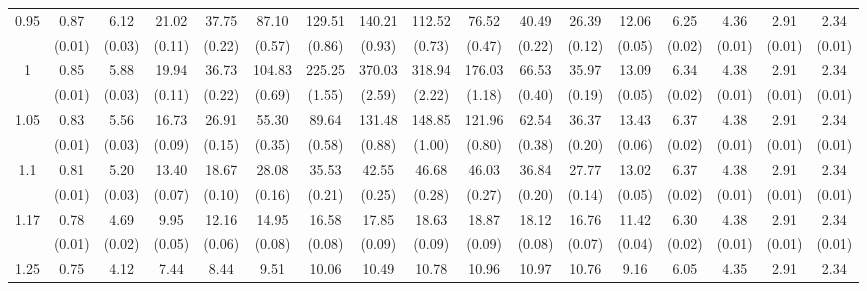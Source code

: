 \documentclass[12pt]{article}  %
\theoremstyle{plain}
\begin{document}
\begin{sidewaystable}[htbp]
\begin{tabular}{ccccccccccccccccc}
\multirow{2}{*}{0.95}  &0.87& 6.12& 21.02 &37.75 & 87.10& 129.51& 140.21& 112.52 & 76.52 &40.49& 26.39& 12.06& 6.25 &4.36& 2.91& 2.34 \\                
					  & (0.01)&   (0.03)&  (0.11)&  (0.22)&  (0.57)&  (0.86)&  (0.93)&  (0.73)&  (0.47)&  (0.22)&  (0.12)&  (0.05)& (0.02)& (0.01)& (0.01)& (0.01)\\ \hline
\multirow{2}{*}{1}  &  0.85 &5.88 &19.94& 36.73 &104.83& 225.25& 370.03 &318.94& 176.03& 66.53& 35.97& 13.09 &6.34 &4.38& 2.91& 2.34\\
                      & (0.01)&   (0.03)&  (0.11)&  (0.22)&  (0.69)&  (1.55)&  (2.59)&  (2.22)&  (1.18)&  (0.40)&  (0.19)&  (0.05)& (0.02)& (0.01)& (0.01)& (0.01)\\ \hline                                                                     
\multirow{2}{*}{1.05}  & 0.83 &5.56& 16.73& 26.91 & 55.30 & 89.64& 131.48& 148.85 &121.96 &62.54 &36.37& 13.43 &6.37 &4.38& 2.91 &2.34\\
                      & (0.01)&   (0.03)&  (0.09)&  (0.15)&  (0.35)&  (0.58)&  (0.88)&  (1.00)&  (0.80)&  (0.38)&  (0.20)&  (0.06)& (0.02)& (0.01)& (0.01)& (0.01)\\ \hline                                                                                                                                          
\multirow{2}{*}{1.1}  &0.81& 5.20& 13.40& 18.67&  28.08 & 35.53 & 42.55 & 46.68 & 46.03& 36.84& 27.77& 13.02& 6.37 &4.38& 2.91& 2.34\\
                      &  (0.01)&   (0.03)&  (0.07)&  (0.10)&  (0.16)&  (0.21)&  (0.25)&  (0.28)&  (0.27)&  (0.20)&  (0.14)&  (0.05)& (0.02)& (0.01)& (0.01)& (0.01)\\ \hline
\multirow{2}{*}{1.17}  &0.78& 4.69 & 9.95& 12.16 & 14.95 & 16.58 & 17.85 & 18.63 & 18.87& 18.12& 16.76& 11.42& 6.30&4.38& 2.91& 2.34\\
                      & (0.01)&   (0.02)&  (0.05)&  (0.06)&  (0.08)&  (0.08)&  (0.09)&  (0.09)&  (0.09)& (0.08)&  (0.07)&  (0.04)& (0.02)& (0.01)& (0.01)& (0.01)\\ \hline                                                                                                                                                                                                                                                                                    
                                                                     \multirow{2}{*}{1.25}  &0.75& 4.12 & 7.44  &8.44  & 9.51 & 10.06 & 10.49 & 10.78 & 10.96& 10.97 &10.76 &9.16& 6.05& 4.35& 2.91& 2.34\\

\end{tabular}
\end{sidewaystable}
\end{document}
